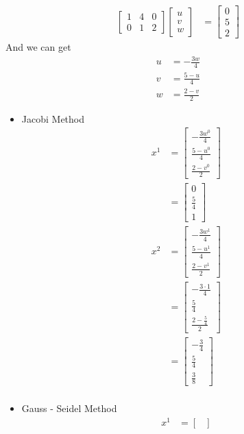 \documentclass{article}
\begin{document}
\begin{enumerate}
\begin{enumerate}
\begin{align*}
\begin{bmatrix}
1&4&0\\
0&1&2
\end{bmatrix}\begin{bmatrix}
u\\v\\w
\end{bmatrix}&=\begin{bmatrix}
0\\5\\2
\end{bmatrix}
\end{align*}
And we can get\begin{align*}
u &= -\frac{3w}{4}\\
v &= \frac{5-u}{4}\\
w&= \frac{2-v}{2}
\end{align*}
\begin{itemize}
\item Jacobi Method
\begin{align*}
x^1 &=\begin{bmatrix}
 -\frac{3w^0}{4}\\
 \frac{5-u^0}{4}\\
 \frac{2-v^0}{2}
\end{bmatrix}\\
&=\begin{bmatrix}
 0\\
 \frac{5}{4}\\
1
\end{bmatrix}\\
x^2 &=\begin{bmatrix}
 -\frac{3w^1}{4}\\
 \frac{5-u^1}{4}\\
 \frac{2-v^1}{2}
\end{bmatrix}\\
&=\begin{bmatrix}
 -\frac{3\cdot 1}{4}\\
 \frac{5}{4}\\
 \frac{2- \frac{5}{4}}{2}
\end{bmatrix}\\
&=\begin{bmatrix}
 -\frac{3}{4}\\
 \frac{5}{4}\\
\frac{3}{8}
\end{bmatrix}\\
\end{align*}
\item Gauss - Seidel Method
\begin{align*}
x^1 &=\begin{bmatrix}

\end{bmatrix}
\end{align*}
\end{itemize}
\end{enumerate}
\end{enumerate}
\end{document}
